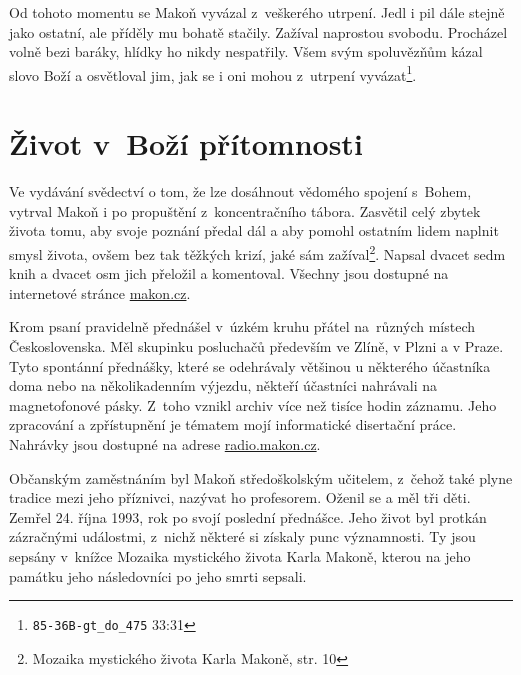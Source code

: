 Od tohoto momentu se Makoň vyvázal z~veškerého utrpení. Jedl i pil dále stejně
jako ostatní, ale příděly mu bohatě stačily. Zažíval naprostou svobodu.
Procházel volně bezi baráky, hlídky ho nikdy nespatřily. Všem svým spoluvězňům
kázal slovo Boží a osvětloval jim, jak se i oni mohou z~utrpení
vyvázat\footnote{\texttt{85-36B-gt\_do\_475} 33:31}.

\section{Život v~Boží přítomnosti}

Ve vydávání svědectví o tom, že lze dosáhnout vědomého spojení s~Bohem, vytrval
Makoň i po propuštění z~koncentračního tábora. Zasvětil celý zbytek života tomu,
aby svoje poznání předal dál a aby pomohl ostatním lidem
naplnit smysl života, ovšem bez tak těžkých krizí, jaké sám
zažíval\footnote{Mozaika mystického života Karla Makoně, str. 10}. Napsal
dvacet sedm knih a dvacet osm jich přeložil a komentoval. Všechny jsou dostupné
na internetové stránce \url{makon.cz}.

Krom psaní pravidelně přednášel v~úzkém kruhu přátel na~různých místech
Československa. Měl skupinku posluchačů především ve Zlíně, v Plzni a v Praze.
Tyto spontánní přednášky, které se odehrávaly většinou u některého účastníka
doma nebo na několikadenním výjezdu, někteří účastníci nahrávali na
magnetofonové pásky. Z~toho vznikl archiv více než tisíce hodin záznamu. Jeho
zpracování a zpřístupnění je tématem mojí informatické disertační
práce\cite{kruuza2021iterativni}. Nahrávky jsou dostupné na adrese
\url{radio.makon.cz}.

Občanským zaměstnáním byl Makoň středoškolským učitelem, z~čehož také plyne
tradice mezi jeho příznivci, nazývat ho profesorem. Oženil se a měl tři děti.
Zemřel 24. října 1993, rok po svojí poslední přednášce. Jeho život byl protkán
zázračnými událostmi, z~nichž některé si získaly punc významnosti. Ty jsou
sepsány v~knížce Mozaika mystického života Karla Makoně\cite{kaliban2002mozaika}, kterou na
jeho památku jeho následovníci po jeho smrti sepsali.


